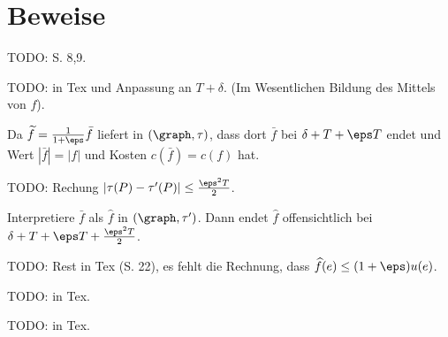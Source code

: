 \section{Beweise}

\begin{standaloneProof}
    TODO: S. 8,9.
\end{standaloneProof}

\begin{standaloneProof}
    TODO: in Tex und Anpassung an $T + \delta$.
    (Im Wesentlichen Bildung des Mittels von $f$).
\end{standaloneProof}

\begin{standaloneProof}
    Da $\widetilde{f} = \frac{1}{1 + \eps} \bar{f}$ liefert 
    in $(\graph, \tau)$, dass dort $\bar{f}$ bei $\delta + T + \eps T$ endet
    und Wert $|\bar{f}| = |f|$ und Kosten $c(\bar{f}) = c(f)$ hat.

    TODO: Rechung $|\tau(P) - \tau'(P)| \leq \frac{\eps^2T}{2}$.

    Interpretiere $\bar{f}$ als $\widehat{f}$ in $(\graph, \tau')$. Dann endet
    $\widehat{f}$ offensichtlich bei $\delta + T + \eps T + \frac{\eps^2T}{2}$.

    TODO: Rest in Tex (S. 22), es fehlt die Rechnung, dass
        $\widehat{f}(e) \leq (1+\eps)u(e)$.
\end{standaloneProof}

\begin{standaloneProof}
    TODO: in Tex.
\end{standaloneProof}

\begin{standaloneProof}
    TODO: in Tex.
\end{standaloneProof}

\endinput
